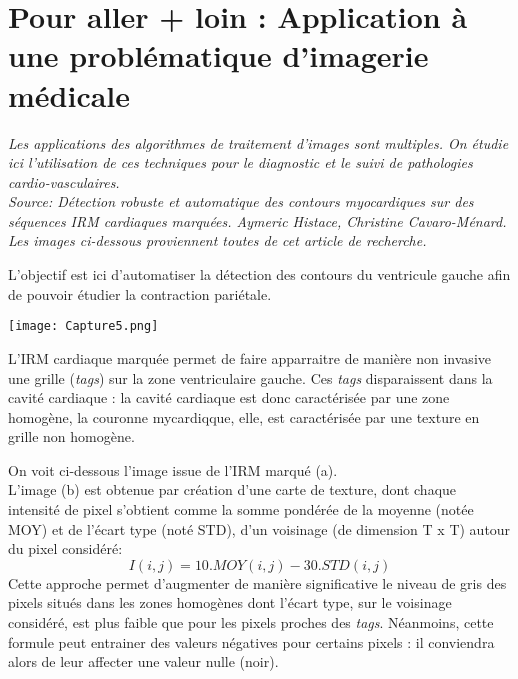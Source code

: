 \section*{Pour aller + loin : Application à une problématique d'imagerie médicale}


\textit{
Les applications des algorithmes de traitement d'images sont multiples. On étudie ici l'utilisation de ces techniques pour le diagnostic et le suivi de pathologies cardio-vasculaires.}
\\
\textit{Source: Détection robuste et automatique des contours myocardiques sur des séquences IRM cardiaques marquées. Aymeric Histace, Christine Cavaro-Ménard. Les images ci-dessous proviennent toutes de cet article de recherche.}



\begin{obj}
L'objectif est ici d'automatiser la détection des contours du ventricule gauche afin de pouvoir étudier la contraction pariétale.
\end{obj}

\begin{marginfigure}
\texttt{[image: Capture5.png]}
\end{marginfigure}
L'IRM cardiaque marquée permet de faire apparraitre de manière non invasive une grille (\textit{tags}) sur la zone ventriculaire gauche. Ces \textit{tags} disparaissent dans la cavité cardiaque : la cavité cardiaque est donc caractérisée par une zone homogène, la couronne mycardiqque, elle, est caractérisée par une texture en grille non homogène.



On voit ci-dessous l'image issue de l'IRM marqué (a).\\
L'image (b) est obtenue par création d'une carte de texture, dont chaque intensité de pixel s'obtient comme la somme pondérée de la moyenne (notée MOY) et de l'écart type (noté STD), d'un voisinage (de dimension T x T) autour du pixel considéré:
\begin{equation}
I(i,j)=10.MOY(i,j)-30.STD(i,j)
\end {equation}
Cette approche permet d'augmenter de manière significative le niveau de gris des pixels situés dans les zones homogènes dont l'écart type, sur le voisinage considéré, est plus faible que pour les pixels proches des \textit{tags}. Néanmoins, cette formule peut entrainer des valeurs négatives pour certains pixels : il conviendra alors de leur affecter une valeur nulle (noir).\\

